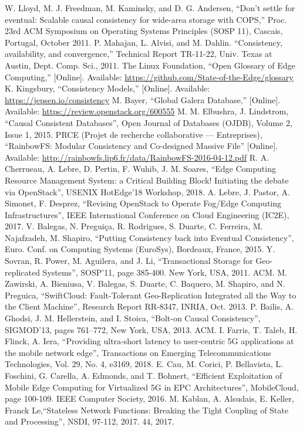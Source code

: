 \documentclass[conference]{IEEEtran}
\begin{document}
\begin{thebibliography}{00}
 W. Lloyd, M. J. Freedman, M. Kaminsky, and D. G. Andersen, ``Don’t settle for eventual: Scalable causal consistency for wide-area storage with COPS,'' Proc. 23rd ACM Symposium on Operating Systems Principles (SOSP 11), Cascais, Portugal, October 2011.
 P. Mahajan, L. Alvisi, and M. Dahlin. ``Consistency, availability, and convergence,'' Technical Report TR-11-22, Univ. Texas at Austin, Dept. Comp. Sci., 2011.
 The Linux Foundation, ``Open Glossary of Edge Computing,'' [Online]. Available: \url{https://github.com/State-of-the-Edge/glossary}
 K. Kingsbury, ``Consistency Models,'' [Online]. Available: \url{https://jepsen.io/consistency}
 M. Bayer, ``Global Galera Database,'' [Online]. Available: \url{https://review.openstack.org/600555}
 M. M. Elbushra, J. Lindstrom, ``Causal Consistent Databases'', Open Journal of Databases (OJDB), Volume 2, Issue 1, 2015.
 PRCE (Projet de recherche collaborative — Entreprises), ``RainbowFS: Modular Consistency and Co-designed Massive File'' [Online]. Available: \url{http://rainbowfs.lip6.fr/data/RainbowFS-2016-04-12.pdf}
 R. A. Cherrueau, A. Lebre, D. Pertin, F. Wuhib, J. M. Soares, ``Edge Computing Resource Management System: a Critical Building Block! Initiating the debate via OpenStack'', USENIX HotEdge’18 Workshop, 2018.
 A. Lebre, J. Pastor, A. Simonet, F. Desprez, ``Revising OpenStack to Operate Fog/Edge Computing Infrastructures'', IEEE International Conference on Cloud Engineering (IC2E), 2017.
 V. Balegas, N. Preguiça, R. Rodrigues, S. Duarte, C. Ferreira, M. Najafzadeh, M. Shapiro, ``Putting Consistency back into Eventual Consistency'', Euro. Conf. on Computing Systems (EuroSys), Bordeaux, France, 2015.
 Y. Sovran, R. Power, M. Aguilera, and J. Li, ``Transactional Storage for Geo-replicated Systems'', SOSP'11, page 385-400. New York, USA, 2011. ACM.
 M. Zawirski, A. Bieniusa, V. Balegas, S. Duarte, C. Baquero, M. Shapiro, and N. Preguica, ``SwiftCloud: Fault-Tolerant Geo-Replication Integrated all the Way to the Client Machine'', Research Report RR-8347, INRIA, Oct. 2013.
 P. Bailis, A. Ghodsi, J. M. Hellerstein, and I. Stoica, ``Bolt-on Causal Consistency'', SIGMOD'13, pages 761–772, New York, USA, 2013. ACM.
 I. Farris, T. Taleb, H. Flinck, A. Iera, ``Providing ultra‐short latency to user‐centric 5G applications at the mobile network edge'', Transactions on Emerging Telecommunications Technologies, Vol. 29, No. 4, e3169, 2018.
 E. Cau, M. Corici, P. Bellavista, L. Foschini, G. Carella, A. Edmonds, and T. Bohnert, ``Efficient Exploitation of Mobile Edge Computing for Virtualized 5G in EPC Architectures'', MobileCloud, page 100-109. IEEE Computer Society, 2016.
 M. Kablan, A. Alsudais, E. Keller, Franck Le,``Stateless Network Functions: Breaking the Tight Coupling of State and Processing'', NSDI, 97-112, 2017. 44, 2017.
\end{thebibliography}
\end{document}
